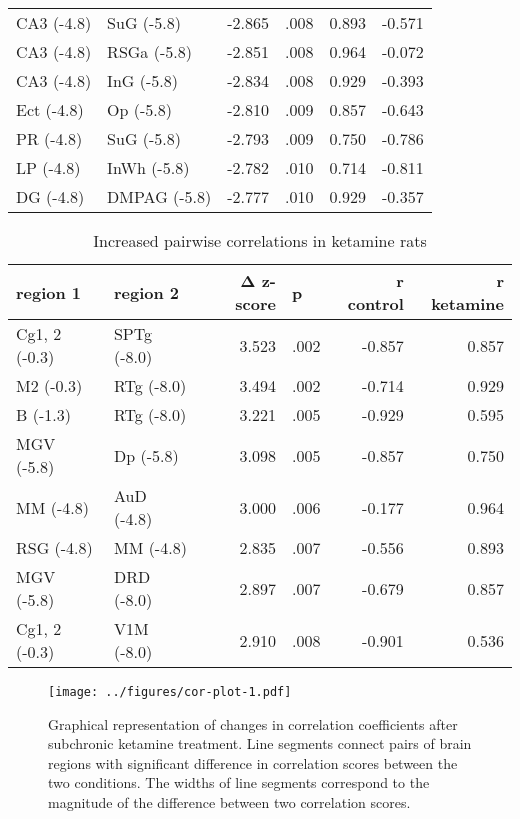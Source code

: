 \documentclass[man]{apa6}
\begin{document}
\begin{longtable}{llrlrr}
\addlinespace
CA3 (-4.8) & SuG (-5.8) & -2.865 & .008 & 0.893 & -0.571\\
CA3 (-4.8) & RSGa (-5.8) & -2.851 & .008 & 0.964 & -0.072\\
CA3 (-4.8) & InG (-5.8) & -2.834 & .008 & 0.929 & -0.393\\
Ect (-4.8) & Op (-5.8) & -2.810 & .009 & 0.857 & -0.643\\
PR (-4.8) & SuG (-5.8) & -2.793 & .009 & 0.750 & -0.786\\
\addlinespace
LP (-4.8) & InWh (-5.8) & -2.782 & .010 & 0.714 & -0.811\\
DG (-4.8) & DMPAG (-5.8) & -2.777 & .010 & 0.929 & -0.357\\*
\end{longtable}
\endgroup{}

\begingroup\fontsize{12}{14}\selectfont

\begin{longtable}{llrlrr}
\caption{\label{tab:table-negative}Increased pairwise correlations in ketamine rats}\\
\toprule
region 1 & region 2 & Δ z-score & p & r control & r ketamine\\
\midrule
Cg1, 2 (-0.3) & SPTg (-8.0) & 3.523 & .002 & -0.857 & 0.857\\
M2 (-0.3) & RTg (-8.0) & 3.494 & .002 & -0.714 & 0.929\\
B (-1.3) & RTg (-8.0) & 3.221 & .005 & -0.929 & 0.595\\
MGV (-5.8) & Dp (-5.8) & 3.098 & .005 & -0.857 & 0.750\\
MM (-4.8) & AuD (-4.8) & 3.000 & .006 & -0.177 & 0.964\\
\addlinespace
RSG (-4.8) & MM (-4.8) & 2.835 & .007 & -0.556 & 0.893\\
MGV (-5.8) & DRD (-8.0) & 2.897 & .007 & -0.679 & 0.857\\
Cg1, 2 (-0.3) & V1M (-8.0) & 2.910 & .008 & -0.901 & 0.536\\
\bottomrule
\end{longtable}
\endgroup{}




\begin{figure}
\centering
\texttt{[image: ../figures/cor-plot-1.pdf]}
\caption{\label{fig:cor-plot}Graphical representation of changes in correlation coefficients after subchronic
ketamine treatment. Line segments connect pairs of brain regions with significant difference in correlation scores between the two conditions. The widths of line segments correspond to the magnitude of the difference between two correlation scores.}
\end{figure}
\end{document}
